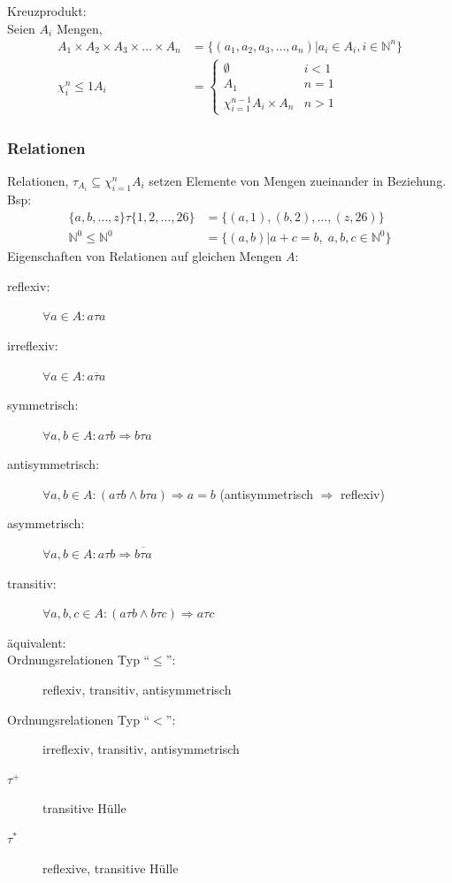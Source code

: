 \documentclass{scrartcl}
\begin{document}
Kreuzprodukt: \\
Seien $A_i$ Mengen,
\begin{align*}
A_1 \times A_2 \times A_3 \times \dots \times A_n &= \{ \left(a_1,a_2,a_3,\dots,a_n\right) | a_i\in A_i, i\in \mathds{N}^n\} \\
\chi^n_i\leq1 A_i &=
\begin{cases}
\emptyset & i<1 \\
A_1 & n=1 \\
\chi^{n-1}_{i=1} A_i \times A_n & n>1
\end{cases}
\end{align*}

\subsubsection*{Relationen}
Relationen, $\tau_{A_i} \subseteq \chi^n_{i=1} A_i$ setzen Elemente von Mengen zueinander in Beziehung. \\
Bsp:
\begin{align*}
    \{a,b,\dots,z\} \tau \{1,2,\dots,26\} &= \{(a,1),(b,2),\dots,(z,26)\} \\
    \mathds{N}^0 \leq \mathds{N}^0 &= \{(a,b) | a+c=b,\; a,b,c\in \mathds{N}^0\}
\end{align*}
Eigenschaften von Relationen auf gleichen Mengen $A$:
\begin{description}
    \item[reflexiv:] $\forall a\in A: a\tau a$
    \item[irreflexiv:]$\forall a\in A: \overline{a\tau a}$
    \item[symmetrisch:]$\forall a,b\in A: a\tau b \Rightarrow b\tau a$
    \item[antisymmetrisch:] $\forall a,b\in A: \left(a\tau b\wedge b\tau a\right) \Rightarrow a=b$ {\tiny (antisymmetrisch $\Rightarrow$ reflexiv)}
    \item[asymmetrisch:] $\forall a,b\in A: a\tau b \Rightarrow \overline{b\tau a}$
    \item[transitiv:] $\forall a,b,c\in A: \left(a\tau b\wedge b\tau c\right) \Rightarrow a\tau c$
    \item[äquivalent:] 
    \item[Ordnungsrelationen Typ "`$\leq$"':] reflexiv, transitiv, antisymmetrisch
    \item[Ordnungsrelationen Typ "`$<$"':] irreflexiv, transitiv, antisymmetrisch
    \item[$\tau^+$] transitive Hülle
    \item[$\tau^*$] reflexive, transitive Hülle
\end{description}
\end{document}
